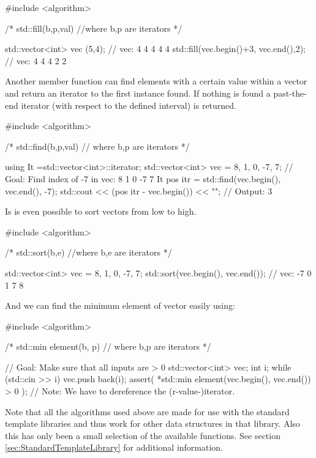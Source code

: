 \documentclass[10pt,a4paper]{scrartcl}
\begin{document}
\begin{multicols*}{2}
\begin{TPCpp}
#include <algorithm>

/*
std::fill(b,p,val) //where b,p are iterators
*/

std::vector<int> vec (5,4);            // vec: 4 4 4 4 4
std::fill(vec.begin()+3, vec.end(),2); // vec: 4 4 4 2 2
\end{TPCpp}

Another member function can find elements with a certain value within a vector and return an iterator to the first instance found. If nothing is found a past-the-end iterator (with respect to the defined interval) is returned.

\begin{TPCpp}
#include <algorithm>

/*
std::find(b,p,val) // where b,p are iterators
*/

using It =std::vector<int>::iterator;
std::vector<int> vec = {8, 1, 0, -7, 7};
// Goal: Find index of -7 in vec: 8 1 0 -7 7
It pos itr = std::find(vec.begin(), vec.end(), -7);
std::cout << (pos itr - vec.begin()) << "\n"; // Output: 3
\end{TPCpp}

Is is even possible to sort vectors from low to high.

\begin{TPCpp}
#include <algorithm>

/*
std::sort(b,e) //where b,e are iterators
*/

std::vector<int> vec = {8, 1, 0, -7, 7};
std::sort(vec.begin(), vec.end()); // vec: -7 0 1 7 8
\end{TPCpp}

And we can find the minimum element of vector easily using:

\begin{TPCpp}
#include <algorithm>

/*
std::min element(b, p) // where b,p are iterators
*/

// Goal: Make sure that all inputs are > 0
std::vector<int> vec;
int i;
while (std::cin >> i)
vec.push back(i);
assert( *std::min element(vec.begin(), vec.end()) > 0 );
// Note: We have to dereference the (r-value-)iterator.
\end{TPCpp}

Note that all the algorithms used above are made for use with the standard template libraries and thus work for other data structures in that library. Also this has only been a small selection of the available functions. See section \ref{sec:StandardTemplateLibrary} for additional information.


\end{multicols*}
\end{document}
